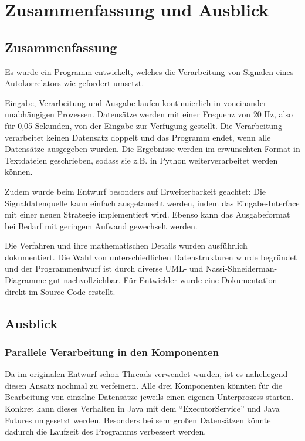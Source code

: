 \chapter{Zusammenfassung und Ausblick}\label{ch:zusammenfassung-und-ausblick}

\section{Zusammenfassung}\label{sec:zusammenfassung}
Es wurde ein Programm entwickelt, welches die Verarbeitung von Signalen eines Autokorrelators wie gefordert umsetzt.

Eingabe, Verarbeitung und Ausgabe laufen kontinuierlich in voneinander unabhängigen Prozessen.
Datensätze werden mit einer Frequenz von 20 Hz, also für 0,05 Sekunden, von der Eingabe zur Verfügung gestellt.
Die Verarbeitung verarbeitet keinen Datensatz doppelt und das Programm endet, wenn alle Datensätze ausgegeben wurden.
Die Ergebnisse werden im erwünschten Format in Textdateien geschrieben, sodass sie z.B. in Python weiterverarbeitet werden können.

Zudem wurde beim Entwurf besonders auf Erweiterbarkeit geachtet:
Die Signaldatenquelle kann einfach ausgetauscht werden, indem das Eingabe-Interface mit einer neuen Strategie implementiert wird.
Ebenso kann das Ausgabeformat bei Bedarf mit geringem Aufwand gewechselt werden.

Die Verfahren und ihre mathematischen Details wurden ausführlich dokumentiert.
Die Wahl von unterschiedlichen Datenstrukturen wurde begründet und der Programmentwurf ist durch diverse UML- und Nassi-Shneiderman-Diagramme gut nachvollziehbar.
Für Entwickler wurde eine Dokumentation direkt im Source-Code erstellt.


\section{Ausblick}\label{sec:ausblick}

\subsection{Parallele Verarbeitung in den Komponenten}\label{subsec:parallel}
Da im originalen Entwurf schon Threads verwendet wurden, ist es naheliegend diesen Ansatz nochmal zu verfeinern.
Alle drei Komponenten könnten für die Bearbeitung von einzelne Datensätze jeweils einen eigenen Unterprozess starten.
Konkret kann dieses Verhalten in Java mit dem \enquote{ExecutorService} und Java Futures umgesetzt werden.
Besonders bei sehr großen Datensätzen könnte dadurch die Laufzeit des Programms verbessert werden.

